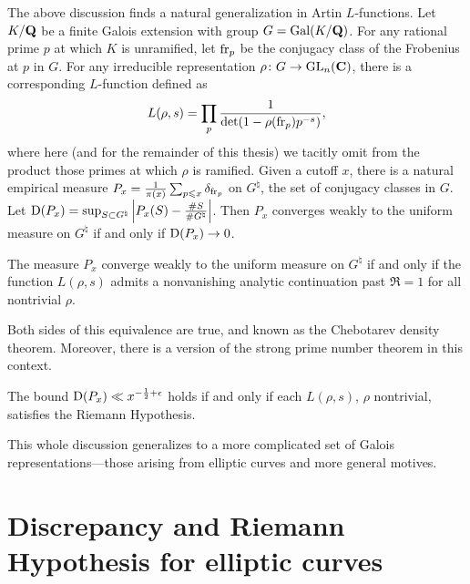 The above discussion finds a natural generalization in Artin $L$-functions. 
Let $K/\mathbf{Q}$ be a finite Galois extension with group $G=\operatorname{Gal}(K/\mathbf{Q})$. For any 
rational prime $p$ at which $K$ is unramified, let $\mathrm{fr}_p$ be the conjugacy 
class of the Frobenius at $p$ in $G$. For any irreducible representation 
$\rho\colon G\to \operatorname{GL}_n(\mathbf{C})$, there is a corresponding $L$-function defined as 
\[
	L(\rho,s) = \prod_p \frac{1}{\det(1-\rho(\mathrm{fr}_p) p^{-s})} ,
\]
where here (and for the remainder of this thesis) we tacitly omit from the 
product those primes at which $\rho$ is ramified. Given a cutoff $x$, there is 
a natural empirical measure 
$P_x = \frac{1}{\pi(x)} \sum_{p\leqslant x} \delta_{\mathrm{fr}_p}$ on 
$G^\natural$, the set of conjugacy classes in $G$. Let 
$\operatorname{D}(P_x) = \sup_{S\subset G^\natural} \left| P_x(S) - \frac{\# S}{\# G^\natural}\right|$. 
Then $P_x$ converges weakly to the uniform measure on $G^\natural$ if and 
only if $\operatorname{D}(P_x) \to 0$. 

\begin{theorem}
The measure $P_x$ converge weakly to the uniform measure on $G^\natural$ if and 
only if the function $L(\rho,s)$ admits a nonvanishing analytic continuation 
past $\Re = 1$ for all nontrivial $\rho$. 
\end{theorem}

Both sides of this equivalence are true, and known as the Chebotarev density 
theorem. Moreover, there is a version of the strong prime number theorem in 
this context. 

\begin{theorem}
The bound $\operatorname{D}(P_x) \ll x^{-\frac 1 2+\epsilon}$ holds if and only if each
$L(\rho,s)$, $\rho$ nontrivial, satisfies the Riemann Hypothesis. 
\end{theorem}

This whole discussion generalizes to a more complicated set of Galois 
representations---those arising from elliptic curves and more general motives.  





\section{Discrepancy and Riemann Hypothesis for elliptic curves}

